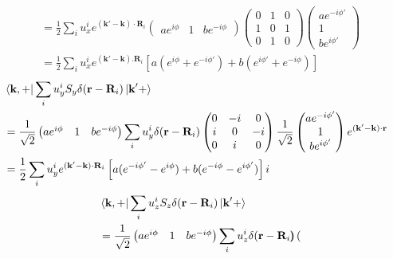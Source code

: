 \documentclass[aps,prb,amsmath,amssymb,footinbib,showpacs,twocolumn]{revtex4-2}
\begin{document}
\begin{widetext}
\begin{align}
            &=
            \frac{1}{2}\sum_{i}u^{i}_{x}e^{(\mathbf{k'-k})\cdot\mathbf{R}_{i}}\begin{pmatrix}
            ae^{i\phi} & 1 &  be^{-i\phi}
        \end{pmatrix}\begin{pmatrix}
0 & 1 & 0\\
1 & 0 & 1\\
0 & 1 & 0
\end{pmatrix}\begin{pmatrix}
              ae^{-i\phi'}  \\
              1 \\
               be^{i\phi'}
            \end{pmatrix}
            \nonumber\\
            &= \frac{1}{2}\sum_{i}u^{i}_{x}e^{(\mathbf{k'-k}).\mathbf{R}_{i}}\left[a(e^{i\phi}+e^{-i\phi'})+b(e^{i\phi'}+e^{-i\phi})\right]
    \end{align}
\begin{align}
  &\bra{\textbf{k},
    +}\sum_{i}u^{i}_{y}S_{y}\delta(\textbf{r}-\textbf{R}_{i})\ket{\textbf{k}'+} \nonumber\\ &= \frac{1}{\sqrt{2}}\begin{pmatrix}
            ae^{i\phi} & 1 &  be^{-i\phi}
        \end{pmatrix}\sum_{i}u^{i}_{y}\delta(\textbf{r}-\textbf{R}_{i}) \begin{pmatrix}
0 & -i & 0\\
i & 0 & -i\\
0 & i & 0
\end{pmatrix}\frac{1}{\sqrt{2}} \begin{pmatrix}
              ae^{-i\phi'}  \\
              1 \\
               be^{i\phi'}
            \end{pmatrix}e^{(\mathbf{k'-k})\cdot\mathbf{r}} \nonumber\\ &
            = \frac{1}{2}\sum_{i}u^{i}_{y}e^{(\mathbf{k'-k})\cdot\mathbf{R}_{i}}\left[a(e^{-i\phi'}-e^{i\phi})+b(e^{-i\phi}-e^{i\phi'})\right]i
\end{align}
\begin{align}
     &\bra{\textbf{k},
    +}\sum_{i}u^{i}_{z}S_{z}\delta(\textbf{r}-\textbf{R}_{i})\ket{\textbf{k}'+} \nonumber \\ &= \frac{1}{\sqrt{2}}\begin{pmatrix}
            ae^{i\phi} & 1 &  be^{-i\phi}
        \end{pmatrix}\sum_{i}u^{i}_{z}\delta(\textbf{r}-\textbf{R}_{i}) \begin{pmatrix}

\end{pmatrix}
\end{align}
\end{widetext}
\end{document}
